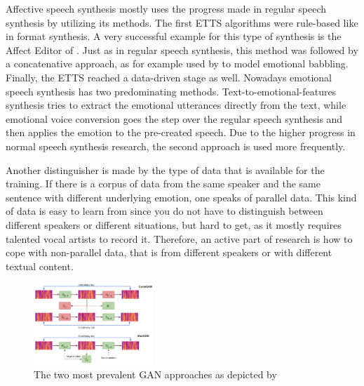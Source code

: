 \documentclass[11pt]{article}
\begin{document}
Affective speech synthesis mostly uses the progress made in regular speech synthesis by utilizing its methods. The first ETTS algorithms were rule-based like in format synthesis. A very successful example for this type of synthesis is the Affect Editor of \cite{cahn_generation_2000}. Just as in regular speech synthesis, this method was followed by a concatenative approach, as for example used by \cite{pierre-yves_production_2003} to model emotional babbling. Finally, the ETTS reached a data-driven stage as well.
Nowadays emotional speech synthesis has two predominating methods. Text-to-emotional-features synthesis tries to extract the emotional utterances directly from the text, while emotional voice conversion goes the step over the regular speech synthesis and then applies the emotion to the pre-created speech. Due to the higher progress in normal speech synthesis research, the second approach is used more frequently.

Another distinguisher is made by the type of data that is available for the training. If there is a corpus of data from the same speaker and the same sentence with different underlying emotion, one speaks of parallel data. This kind of data is easy to learn from since you do not have to distinguish between different speakers or different situations, but hard to get, as it mostly requires talented vocal artists to record it. Therefore, an active part of research is how to cope with non-parallel data, that is from different speakers or with different textual content.

\begin{figure}[h]
 \centering
\includegraphics[width=0.4\textwidth]{"Bilder/GAN.PNG"}
\caption{The two most prevalent GAN approaches as depicted by \cite{triantafyllopoulos_overview_2023}}
\end{figure}
\end{document}
